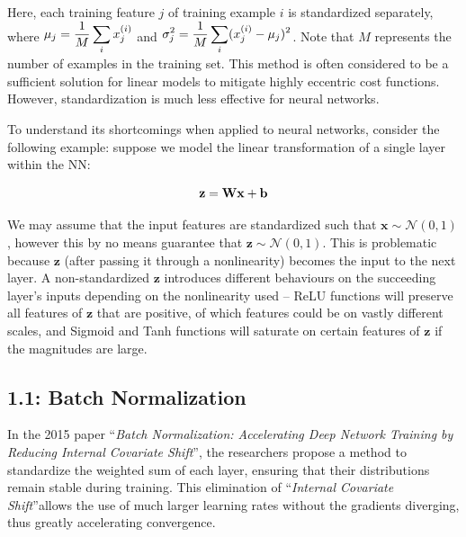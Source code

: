 \documentclass{article}
\begin{document}
\begin{multicols}{2}
Here, each training feature $j$ of training example $i$ is standardized separately, 
where $\begin{aligned}
    \mu_j = {1\over M}\sum_i x^{(i)}_j
\end{aligned}$ and $\begin{aligned}
    \sigma^2_j = {1\over M}\sum_i (x^{(i)}_j - \mu_j)^2
\end{aligned}$. Note that $M$ represents the number of examples in the 
training set. This method is often considered to be a sufficient solution 
for linear models to mitigate highly eccentric cost functions. However, 
standardization is much less effective for neural networks.

To understand its shortcomings when applied to neural networks, consider
the following example: suppose we model the linear transformation 
of a single layer within the NN:

\begin{equation}
    \textbf{z} = \textbf{Wx} + \textbf{b} \notag
\end{equation}

We may assume that the input features are standardized such that $\textbf{x} \sim \mathcal{N}(0, 1)$, 
however this by no means guarantee that $\textbf{z} \sim \mathcal{N}(0, 1)$. This is problematic because 
$\textbf{z}$ (after passing it through a nonlinearity) becomes the input to
the next layer. A non-standardized $\textbf{z}$ introduces different
behaviours on the succeeding layer's inputs depending on the nonlinearity 
used -- ReLU functions will preserve all features of $\textbf{z}$ that are positive,
of which features could be on vastly different scales,
and Sigmoid and Tanh functions will saturate on certain features of $\textbf{z}$
if the magnitudes are large.










\subsection*{1.1: Batch Normalization}
In the 2015 paper ``\textit{Batch Normalization: Accelerating Deep Network Training 
by Reducing Internal Covariate Shift}''\cite{batchnorm}, the researchers
propose a method to standardize the weighted sum of each layer, ensuring that their
distributions remain stable during training. This elimination of ``\textit{Internal Covariate Shift}''allows the use of much larger learning
rates without the gradients diverging, thus greatly accelerating convergence.


\end{multicols}
\end{document}
